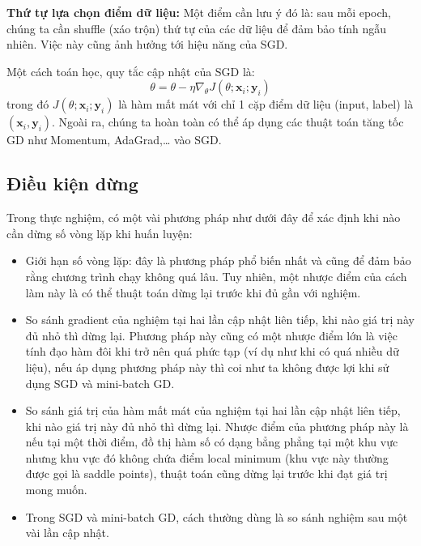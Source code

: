 \textbf{Thứ tự lựa chọn điểm dữ liệu:}
Một điểm cần lưu ý đó là: sau mỗi epoch, chúng ta cần shuffle (xáo trộn) thứ tự của các dữ liệu để đảm bảo tính ngẫu nhiên. Việc này cũng ảnh hưởng tới hiệu năng của SGD.

Một cách toán học, quy tắc cập nhật của SGD là:
$$\theta = \theta - \eta \nabla_{\theta} J(\theta; \mathbf{x}_i; \mathbf{y}_i)$$
trong đó $J(\theta; \mathbf{x}_i; \mathbf{y}_i)$ là hàm mất mát với chỉ 1 cặp điểm dữ liệu (input, label) là $(\mathbf{x}_i, \mathbf{y}_i)$. Ngoài ra, chúng ta hoàn toàn có thể áp dụng các thuật toán tăng tốc GD như Momentum, AdaGrad,… vào SGD.

\subsection{Điều kiện dừng}
Trong thực nghiệm, có một vài phương pháp như dưới đây để xác định khi nào cần dừng số vòng lặp khi huấn luyện:
\begin{itemize}
\item Giới hạn số vòng lặp: đây là phương pháp phổ biến nhất và cũng để đảm bảo rằng chương trình chạy không quá lâu. Tuy nhiên, một nhược điểm của cách làm này là có thể thuật toán dừng lại trước khi đủ gần với nghiệm.
\item So sánh gradient của nghiệm tại hai lần cập nhật liên tiếp, khi nào giá trị này đủ nhỏ thì dừng lại. Phương pháp này cũng có một nhược điểm lớn là việc tính đạo hàm đôi khi trở nên quá phức tạp (ví dụ như khi có quá nhiều dữ liệu), nếu áp dụng phương pháp này thì coi như ta không được lợi khi sử dụng SGD và mini-batch GD.
\item So sánh giá trị của hàm mất mát của nghiệm tại hai lần cập nhật liên tiếp, khi nào giá trị này đủ nhỏ thì dừng lại. Nhược điểm của phương pháp này là nếu tại một thời điểm, đồ thị hàm số có dạng bẳng phẳng tại một khu vực nhưng khu vực đó không chứa điểm local minimum (khu vực này thường được gọi là saddle points), thuật toán cũng dừng lại trước khi đạt giá trị mong muốn.
\item Trong SGD và mini-batch GD, cách thường dùng là so sánh nghiệm sau một vài lần cập nhật.
\end{itemize}


